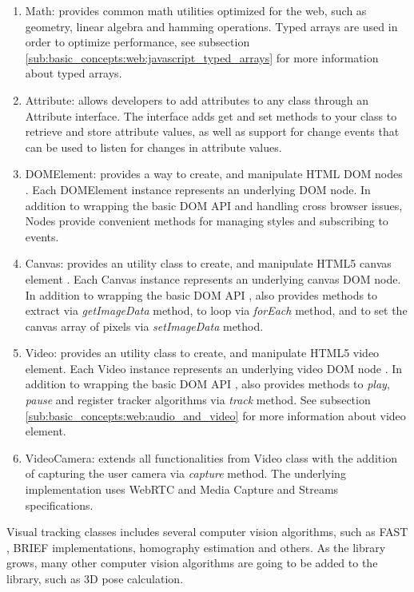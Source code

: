 \begin{enumerate}
  \item Math: provides common math utilities optimized for the web, such as geometry, linear algebra \cite{Hartley2004} and hamming operations. Typed arrays \cite{TypedArray2013} are used in order to optimize performance, see subsection \ref{sub:basic_concepts:web:javascript_typed_arrays} for more information about typed arrays.
  \item Attribute: allows developers to add attributes to any class through an Attribute interface. The interface adds get and set methods to your class to retrieve and store attribute values, as well as support for change events that can be used to listen for changes in attribute values.
  \item DOMElement: provides a way to create, and manipulate HTML \cite{Hickson2013} DOM nodes \cite{WC2006}. Each DOMElement instance represents an underlying DOM node. In addition to wrapping the basic DOM API and handling cross browser issues, Nodes provide convenient methods for managing styles and subscribing to events.
  \item Canvas: provides an utility class to create, and manipulate HTML5 \cite{Hickson2013} canvas element \cite{Canvas2013}. Each Canvas instance represents an underlying canvas DOM node. In addition to wrapping the basic DOM API \cite{WC2006}, also provides methods to extract via \textit{getImageData} method, to loop via \textit{forEach} method, and to set the canvas array of pixels via \textit{setImageData} method.
  \item Video: provides an utility class to create, and manipulate HTML5 \cite{Hickson2013} video element. Each Video instance represents an underlying video DOM node \cite{Canvas2013}. In addition to wrapping the basic DOM API \cite{WC2006}, also provides methods to \textit{play}, \textit{pause} and register tracker algorithms via \textit{track} method. See subsection \ref{sub:basic_concepts:web:audio_and_video} for more information about video element.
  \item VideoCamera: extends all functionalities from Video class with the addition of capturing the user camera via \textit{capture} method. The underlying implementation uses WebRTC \cite{WebRTC2013} and Media Capture and Streams \cite{MediaCapture2013} specifications.
\end{enumerate}

Visual tracking classes includes several computer vision algorithms, such as FAST \cite{RostenFaster2010}, BRIEF \cite{Calonder2010} implementations, homography estimation and others. As the library grows, many other computer vision algorithms are going to be added to the library, such as 3D pose calculation.

